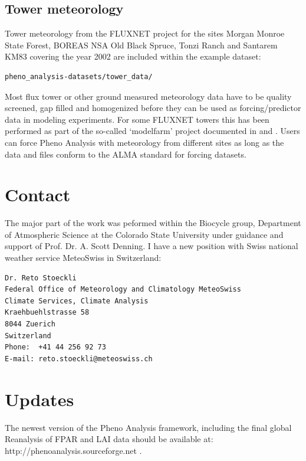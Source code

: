 \documentclass[a4paper,12pt]{article}
\begin{document}
\subsection{Tower meteorology}
Tower meteorology from the FLUXNET project \citep{Baldocchi2001} for the sites Morgan Monroe State Forest, BOREAS NSA Old Black Spruce, Tonzi Ranch and Santarem KM83 covering the year 2002 are included within the example dataset:
\begin{verbatim}
pheno_analysis-datasets/tower_data/
\end{verbatim}
Most flux tower or other ground measured meteorology data have to be quality screened, gap filled and homogenized before they can be used as forcing/predictor data in modeling experiments. For some FLUXNET towers this has been performed as part of the so-called `modelfarm' project documented in \cite{Stockli2005} and \cite{Stockli2008b}. Users can force Pheno Analysis with meteorology from different sites as long as the data and files conform to the ALMA standard \citep{ALMA2008} for forcing datasets. 

\section{Contact}
The major part of the work was peformed within the Biocycle group, Department of Atmospheric Science at the Colorado State University under guidance and support of Prof. Dr. A. Scott Denning. I have a new position with Swiss national weather service MeteoSwiss in Switzerland:
\begin{verbatim}
Dr. Reto Stoeckli
Federal Office of Meteorology and Climatology MeteoSwiss
Climate Services, Climate Analysis
Kraehbuehlstrasse 58
8044 Zuerich
Switzerland
Phone:  +41 44 256 92 73
E-mail: reto.stoeckli@meteoswiss.ch
\end{verbatim}

\section{Updates}

The newest version of the Pheno Analysis framework, including the final global Reanalysis of FPAR and LAI data should be available at: http://phenoanalysis.sourceforge.net .
\end{document}
